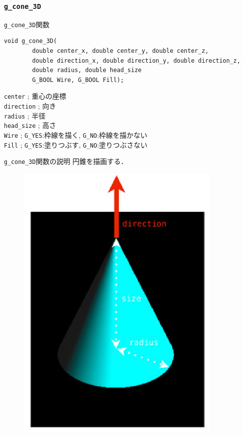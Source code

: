\documentclass[platex,a4paper,12pt]{jsarticle}%
\begin{document}
\clearpage
\subsubsection{\texttt{g\_cone\_3D}}

\begin{itembox}[l]{\texttt{g\_cone\_3D}関数}
\begin{verbatim}
void g_cone_3D(
        double center_x, double center_y, double center_z,
        double direction_x, double direction_y, double direction_z,
        double radius, double head_size
        G_BOOL Wire, G_BOOL Fill);
\end{verbatim}
\verb|center| ; 重心の座標\\
\verb|direction| ; 向き\\
\verb|radius| ; 半径\\
\verb|head_size| ; 高さ\\
\verb|Wire| ; \verb|G_YES|:枠線を描く, \verb|G_NO|:枠線を描かない \\
\verb|Fill| ; \verb|G_YES|:塗りつぶす, \verb|G_NO|:塗りつぶさない
\end{itembox}

\begin{itembox}[l]{\texttt{g\_cone\_3D}関数の説明}
円錐を描画する．
\end{itembox}
\begin{figure}[htb]
\centering
	\includegraphics[width=100mm]{Canvas_g_cone.eps}
\end{figure}
\end{document}
